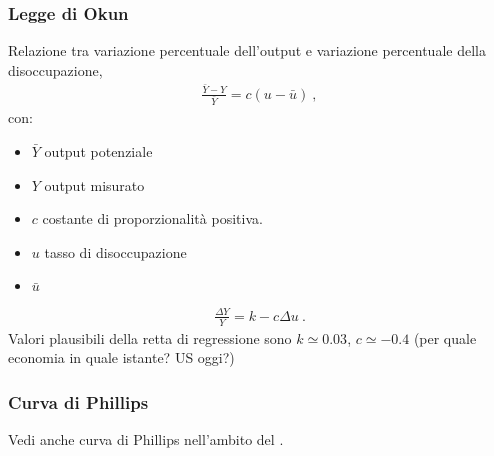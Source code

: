 \documentclass[letterpaper,10pt,italian]{jupyterBook}
\begin{document}
\subsubsection{Legge di Okun}
\label{\detokenize{ch/macro:legge-di-okun}}\label{\detokenize{ch/macro:economics-hs-macro-intro-macro-vars-okun}}
\sphinxAtStartPar
Relazione tra variazione percentuale dell’output e variazione percentuale della disoccupazione,
\begin{equation*}
\begin{split}\frac{\bar{Y} - Y}{\bar{Y}} = c ( u - \bar{u} ) \ ,\end{split}
\end{equation*}
\sphinxAtStartPar
con:
\begin{itemize}
\item {} 
\sphinxAtStartPar
\(\bar{Y}\) output potenziale

\item {} 
\sphinxAtStartPar
\(Y\) output misurato

\item {} 
\sphinxAtStartPar
\(c\) costante di proporzionalità positiva.

\item {} 
\sphinxAtStartPar
\(u\) tasso di disoccupazione

\item {} 
\sphinxAtStartPar
\(\bar{u}\) {\hyperref[\detokenize{ch/macro:economics-hs-macro-medium-run-unemployment-phillips}]{}}

\end{itemize}
\begin{equation*}
\begin{split}\frac{\Delta Y}{Y} = k - c \Delta u \ .\end{split}
\end{equation*}
\sphinxAtStartPar
Valori plausibili della retta di regressione sono \(k \simeq 0.03\), \(c \simeq -0.4\) (per quale economia in quale istante? US oggi?)


\subsubsection{Curva di Phillips}
\label{\detokenize{ch/macro:curva-di-phillips}}\label{\detokenize{ch/macro:economics-hs-macro-intro-macro-vars-phillips}}
\sphinxAtStartPar
Vedi anche curva di Phillips nell’ambito del {\hyperref[\detokenize{ch/macro:economics-hs-macro-medium-run-unemployment-phillips}]{}}.
\end{document}
